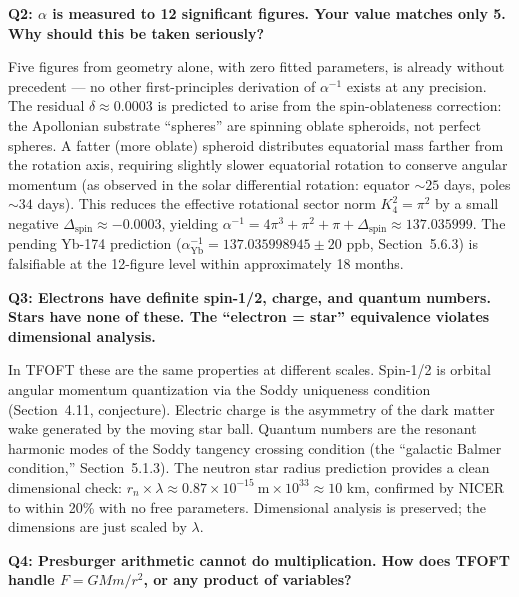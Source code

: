   \begin{mdframed}
  \textbf{Q2: $\alpha$ is measured to 12 significant figures. Your value matches
  only 5. Why should this be taken seriously?}
  \end{mdframed}

  Five figures from geometry alone, with zero fitted parameters, is already without
  precedent --- no other first-principles derivation of $\alpha^{-1}$ exists at any
  precision. The residual $\delta \approx 0.0003$ is predicted to arise from the
  spin-oblateness correction: the Apollonian substrate ``spheres'' are spinning
  oblate spheroids, not perfect spheres. A fatter (more oblate) spheroid distributes
  equatorial mass farther from the rotation axis, requiring slightly slower equatorial
  rotation to conserve angular momentum (as observed in the solar differential
  rotation: equator $\sim 25$ days, poles $\sim 34$ days). This reduces the
  effective rotational sector norm $K_4^2 = \pi^2$ by a small negative $\Delta_{\text{spin}}
  \approx -0.0003$, yielding $\alpha^{-1} = 4\pi^3 + \pi^2 + \pi + \Delta_{\text{spin}}
  \approx 137.035999$. The pending Yb-174 prediction
  ($\alpha^{-1}_{\text{Yb}} = 137.035998945 \pm 20$ ppb, Section~5.6.3) is
  falsifiable at the 12-figure level within approximately 18 months.

  \begin{mdframed}
  \textbf{Q3: Electrons have definite spin-1/2, charge, and quantum numbers.
  Stars have none of these. The ``electron = star'' equivalence violates
  dimensional analysis.}
  \end{mdframed}

  In TFOFT these are the same properties at different scales. Spin-1/2 is orbital
  angular momentum quantization via the Soddy uniqueness condition (Section~4.11,
  conjecture). Electric charge is the asymmetry of the dark matter wake generated
  by the moving star ball. Quantum numbers are the resonant harmonic modes of the
  Soddy tangency crossing condition (the ``galactic Balmer condition,''
  Section~5.1.3). The neutron star radius prediction provides a clean dimensional
  check: $r_n \times \lambda \approx 0.87 \times 10^{-15}\ \text{m} \times 10^{33}
  \approx 10$ km, confirmed by NICER to within 20\% with no free parameters.
  Dimensional analysis is preserved; the dimensions are just scaled by $\lambda$.

  \begin{mdframed}
  \textbf{Q4: Presburger arithmetic cannot do multiplication. How does TFOFT handle
  $F = GMm/r^2$, or any product of variables?}
  \end{mdframed}

